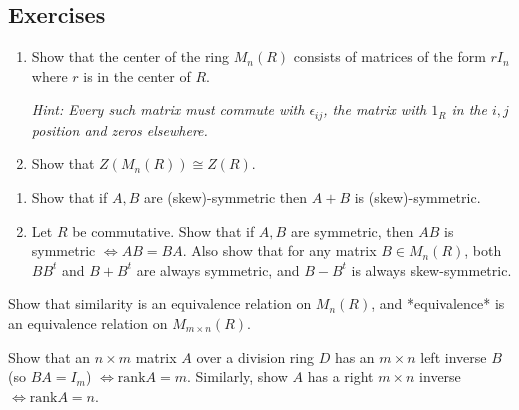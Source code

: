 \subsection{Exercises}

\begin{problem}[Hungerford 7.1.3]
\hfill
\begin{enumerate}
    \item Show that the center of the ring $M_n(R)$ consists of matrices of the form $rI_n$ where $r$ is in the center of $R$.
    
    \textit{Hint: Every such matrix must commute with $\epsilon_{ij}$, the matrix with $1_R$ in the $i,j$ position and zeros elsewhere.}
    
    \item Show that $Z(M_n(R)) \cong Z(R)$.
\end{enumerate}
\end{problem}

\begin{problem}[Hungerford 7.1.5]
\hfill
\begin{enumerate}
    \item Show that if $A, B$ are (skew)-symmetric then $A+B$ is (skew)-symmetric.
    \item Let $R$ be commutative. 
    Show that if $A,B$ are symmetric, then $AB$ is symmetric $\iff AB=BA$.
    Also show that for any matrix $B \in M_n(R)$, both $BB^t$ and $B+B^t$ are always symmetric, and $B-B^t$ is always skew-symmetric.
\end{enumerate}
\end{problem}

\begin{problem}[Hungerford 7.1.7]
Show that similarity is an equivalence relation on $M_n(R)$, and *equivalence* is an equivalence relation on $M_{m\times n}(R)$.
\end{problem}

\begin{problem}[Hungerford 7.2.2]
Show that an $n\times m$ matrix $A$ over a division ring $D$ has an $m\times n$ left inverse $B$ (so $BA = I_m$) $\iff \mathrm{rank} A = m$. Similarly, show $A$ has a right $m\times n$ inverse $\iff \mathrm{rank} A = n$.
\end{problem}

